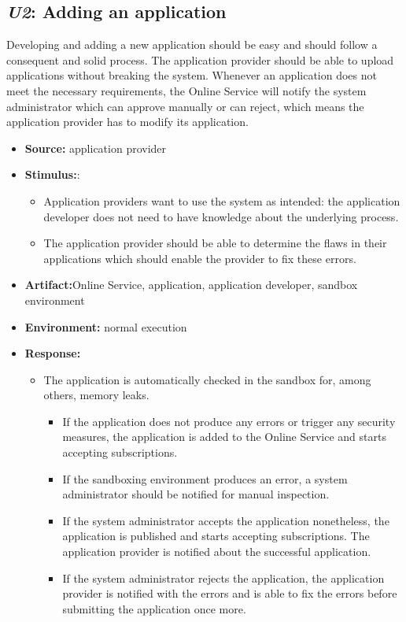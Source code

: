 \subsection{\emph{U2}: Adding an application}
Developing and adding a new application should be easy and should follow a consequent and solid process. The application provider should be able to upload applications without breaking the system. Whenever an application does not meet the necessary requirements, the Online Service will notify the system administrator which can approve manually or can reject, which means the application provider has to modify its application.

\begin{itemize}
    \item \textbf{Source:} application provider
    \item \textbf{Stimulus:}: 
    \begin{itemize}
    \item Application providers want to use the system as intended: the application developer does not need to have knowledge about the underlying process.
    \item The application provider should be able to determine the flaws in their applications which should enable the provider to fix these errors.
    \end{itemize}
    \item \textbf{Artifact:}Online Service, application, application developer, sandbox environment
    \item \textbf{Environment:} normal execution
    \item \textbf{Response:}
        \begin{itemize}
            \item The application is automatically checked in the sandbox for, among others, memory leaks.
            \begin{itemize} 
            \item If the application does not produce any errors or trigger any security measures, the application is added to the Online Service and starts accepting subscriptions.
            \item If the sandboxing environment produces an error, a system administrator should be notified for manual inspection.
            \item If the system administrator accepts the application nonetheless, the application is published and starts accepting subscriptions. The application provider is notified about the successful application.
            \item If the system administrator rejects the application, the application provider is notified with the errors and is able to fix the errors before submitting the application once more.
            \end{itemize}
        \end{itemize}


\end{itemize}
